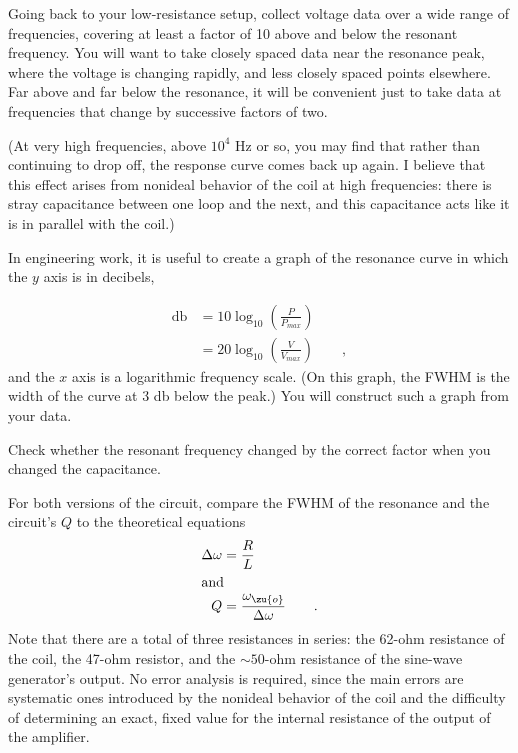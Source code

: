 
Going back to your low-resistance setup, collect voltage
data over a wide range of frequencies, covering at least a factor
of 10 above and below the resonant frequency. You will want to take closely spaced
data near the resonance peak, where the voltage is changing
rapidly, and less closely spaced points elsewhere. Far above
and far below the resonance, it will be convenient just to
take data at frequencies that change by successive factors of two.

(At very high frequencies, above $10^4$  Hz or so, you may
find that rather than continuing to drop off, the response
curve comes back up again. I believe that this effect arises
from nonideal behavior of the coil at high frequencies: there is
stray capacitance between one loop and the next, and this
capacitance acts like it is in parallel with the coil.) 

In engineering work, it is useful to create a graph of the
resonance curve in which the $y$ axis is in decibels,

\begin{align*}
     \text{db}      &= 10\log_{10}\left(\frac{P}{P_{max}}\right)  \\
     			&= 20\log_{10}\left(\frac{V}{V_{max}}\right)  \qquad   ,  
\end{align*}
and the $x$ axis is a logarithmic frequency scale. (On this
graph, the FWHM is the width of the curve at 3 db below the
peak.) You will construct such a graph from your data.

\analysis

Check whether the resonant frequency changed by the correct
factor when you changed the capacitance.

For both versions of the circuit, compare the FWHM of the
resonance and the circuit's $Q$ to the theoretical equations
\begin{align*}
	\Delta \omega	&= \frac{R}{L} \\
\intertext{and}
	Q	&= \frac{\omega_\zu{o}}{\Delta\omega} \qquad   .
\end{align*}
Note that there are a total of three resistances in series:
the 62-ohm resistance of the coil, the 47-ohm resistor, and
the $\sim 50$-ohm resistance of the sine-wave generator's output.
No error analysis is required, since the main errors are
systematic ones introduced by the nonideal behavior of the
coil and the difficulty of determining an exact, fixed value
for the internal resistance of the output of the amplifier.


